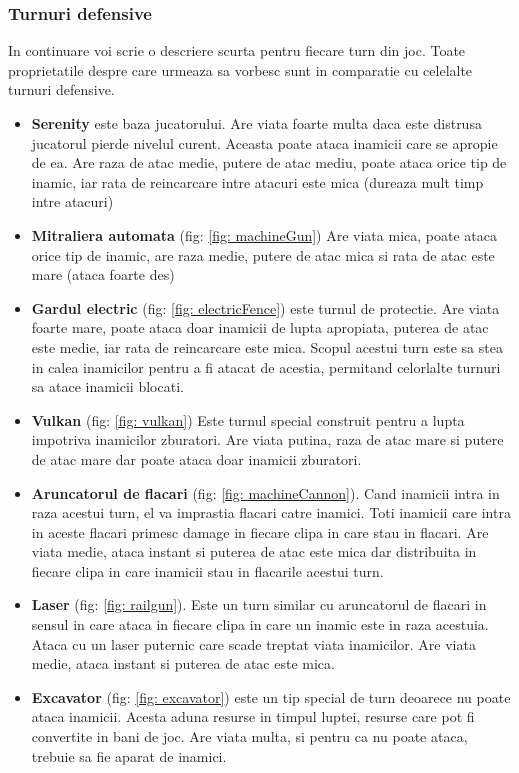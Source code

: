 \documentclass[12pt, a4paper]{article}
\begin{document}
	\subsubsection{Turnuri defensive}
	In continuare voi scrie o descriere scurta pentru fiecare turn din joc. Toate proprietatile despre care urmeaza sa vorbesc sunt in comparatie cu celelalte turnuri defensive.
	\begin{itemize}
		\item \textbf{Serenity} este baza jucatorului. Are viata foarte multa daca este distrusa jucatorul pierde nivelul curent. Aceasta poate ataca inamicii care se apropie de ea. Are raza de atac medie, putere de atac mediu, poate ataca orice tip de inamic, iar rata de reincarcare intre atacuri este mica (dureaza mult timp intre atacuri)
		\item \textbf{Mitraliera automata} (fig: \ref{fig: machineGun}) Are viata mica, poate ataca orice tip de inamic, are raza medie, putere de atac mica si rata de atac este mare (ataca foarte des)
		\item \textbf{Gardul electric} (fig: \ref{fig: electricFence}) este turnul de protectie. Are viata foarte mare, poate ataca doar inamicii de lupta apropiata, puterea de atac este medie, iar rata de reincarcare este mica. Scopul acestui turn este sa stea in calea inamicilor pentru a fi atacat de acestia, permitand celorlalte turnuri sa atace inamicii blocati.
		\item \textbf{Vulkan} (fig: \ref{fig: vulkan}) Este turnul special construit pentru a lupta impotriva inamicilor zburatori. Are viata putina, raza de atac mare si putere de atac mare dar poate ataca doar inamicii zburatori.
		\item \textbf{Aruncatorul de flacari} (fig: \ref{fig: machineCannon}). Cand inamicii intra in raza acestui turn, el va imprastia flacari catre inamici. Toti inamicii care intra in aceste flacari primesc damage in fiecare clipa in care stau in flacari. Are viata medie, ataca instant si puterea de atac este mica dar distribuita in fiecare clipa in care inamicii stau in flacarile acestui turn.
		\item \textbf{Laser} (fig: \ref{fig: railgun}). Este un turn similar cu aruncatorul de flacari in sensul in care ataca in fiecare clipa in care un inamic este in raza acestuia. Ataca cu un laser puternic care scade treptat viata inamicilor. Are viata medie, ataca instant si puterea de atac este mica.
		\item \textbf{Excavator} (fig: \ref{fig: excavator}) este un tip special de turn deoarece nu poate ataca inamicii. Acesta aduna resurse in timpul luptei, resurse care pot fi convertite in bani de joc. Are viata multa, si pentru ca nu poate ataca, trebuie sa fie aparat de inamici.
	\end{itemize}
	
\end{document}
